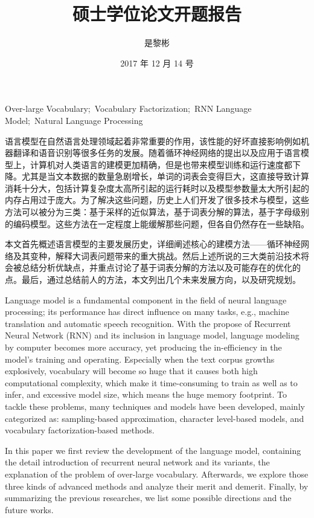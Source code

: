 \documentclass[12pt,a4paper]{article}
\title{硕士学位论文开题报告}
\author{是黎彬}
\date{2017 年 12 月 14 号}
\begin{document}
\maketitle



{Over-large Vocabulary;\ Vocabulary Factorization;\ RNN Language Model;\ Natural Language Processing}

\begin{abstract_ch}
语言模型在自然语言处理领域起着非常重要的作用，该性能的好坏直接影响例如机器翻译和语音识别等很多任务的发展。随着循环神经网络的提出以及应用于语言模型上，计算机对人类语言的建模更加精确，但是也带来模型训练和运行速度都下降。尤其是当文本数据的数量急剧增长，单词的词表会变得巨大，这直接导致计算消耗十分大，包括计算复杂度太高所引起的运行耗时以及模型参数量太大所引起的内存占用过于庞大。为了解决这些问题，历史上人们开发了很多技术与模型，这些方法可以被分为三类：基于采样的近似算法，基于词表分解的算法，基于字母级别的编码模型。这些方法在一定程度上能缓解那些问题，但各自仍然存在一些缺陷。

本文首先概述语言模型的主要发展历史，详细阐述核心的建模方法——循环神经网络及其变种，解释大词表问题带来的重大挑战。然后上述所说的三大类前沿技术将会被总结分析优缺点，并重点讨论了基于词表分解的方法以及可能存在的优化的点。最后，通过总结前人的方法，本文列出几个未来发展方向，以及研究规划。
\end{abstract_ch}
\newpage
\begin{abstract_en}
Language model is a fundamental component in the field of neural language processing; its performance has direct influence on many tasks, e.g., machine translation and automatic speech recognition. With the propose of Recurrent Neural Network (RNN) and its inclusion in language model, language modeling by computer becomes more accuracy, yet producing the in-efficiency in the model’s training and operating. Especially when the text corpus growths explosively, vocabulary will become so huge that it causes both high computational complexity, which make it time-consuming to train as well as to infer, and excessive model size, which means the huge memory footprint. To tackle these problems, many techniques and models have been developed, mainly categorized as: sampling-based approximation, character level-based models, and vocabulary factorization-based methods.

In this paper we first review the development of the language model, containing the detail introduction of recurrent neural network and its variants, the explanation of the problem of over-large vocabulary. Afterwards, we explore those three kinds of advanced methods and analyze their merit and demerit. Finally, by summarizing the previous researches, we list some possible directions and the future works.

\end{abstract_en}
\newpage
\tableofcontents
\newpage
\end{document}
